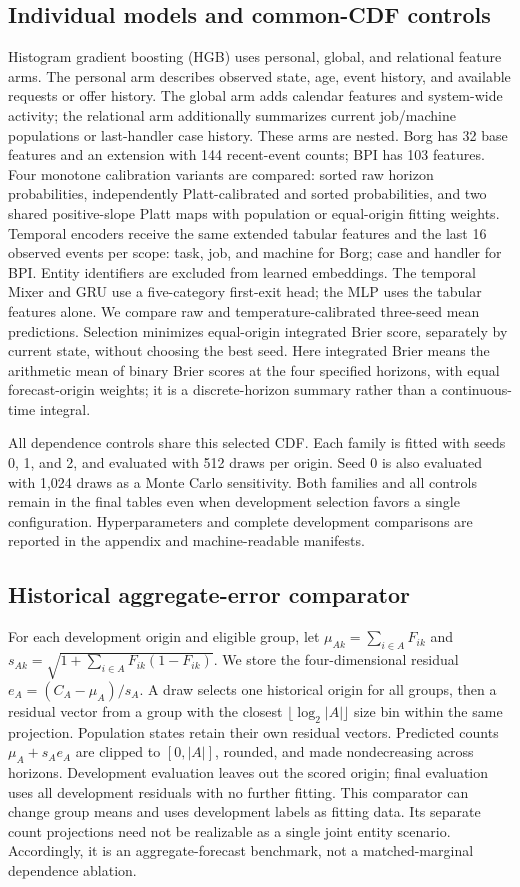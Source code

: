 \subsection{Individual models and common-CDF controls}
Histogram gradient boosting (HGB) uses personal, global, and relational feature
arms. The personal arm describes observed state, age, event history, and
available requests or offer history. The global arm adds calendar features
and system-wide activity; the relational arm additionally summarizes current
job/machine populations or last-handler case history. These arms are nested.
Borg has 32 base features and an extension with 144 recent-event counts;
BPI has 103 features. Four monotone calibration variants are compared: sorted
raw horizon probabilities, independently Platt-calibrated and sorted
probabilities, and two shared positive-slope Platt maps with population or
equal-origin fitting weights. Temporal encoders receive the same extended
tabular features and the last 16 observed events per scope: task, job, and
machine for Borg; case and handler for BPI. Entity identifiers are excluded
from learned embeddings.
The temporal Mixer and GRU use a five-category first-exit head; the MLP uses
the tabular features alone. We compare raw and temperature-calibrated
three-seed mean predictions. Selection minimizes equal-origin integrated
Brier score, separately by current state, without choosing the best seed.
Here integrated Brier means the arithmetic mean of binary Brier scores at
the four specified horizons, with equal forecast-origin weights; it is a
discrete-horizon summary rather than a continuous-time integral.

All dependence controls share this selected CDF. Each family is fitted with
seeds 0, 1, and 2, and evaluated with 512 draws per origin. Seed 0 is also
evaluated with 1,024 draws as a Monte Carlo sensitivity. Both families and all
controls remain in the final tables even when development selection favors a
single configuration. Hyperparameters and complete development comparisons
are reported in the appendix and machine-readable manifests.

\subsection{Historical aggregate-error comparator}
For each development origin and eligible group, let
$\mu_{Ak}=\sum_{i\in A}F_{ik}$ and
$s_{Ak}=\sqrt{1+\sum_{i\in A}F_{ik}(1-F_{ik})}$.
We store the four-dimensional residual
$e_A=(C_A-\mu_A)/s_A$. A draw selects one historical origin for all groups,
then a residual vector from a group with the closest
$\lfloor\log_2 |A|\rfloor$ size bin within the same projection. Population
states retain their own residual vectors. Predicted counts
$\mu_A+s_Ae_A$ are clipped to $[0,|A|]$, rounded, and made nondecreasing across
horizons. Development evaluation leaves out the scored origin; final
evaluation uses all development residuals with no further fitting.
This comparator can change group means and uses development labels as fitting
data. Its separate count projections need not be realizable as a single joint
entity scenario. Accordingly, it is an aggregate-forecast benchmark, not a
matched-marginal dependence ablation.
